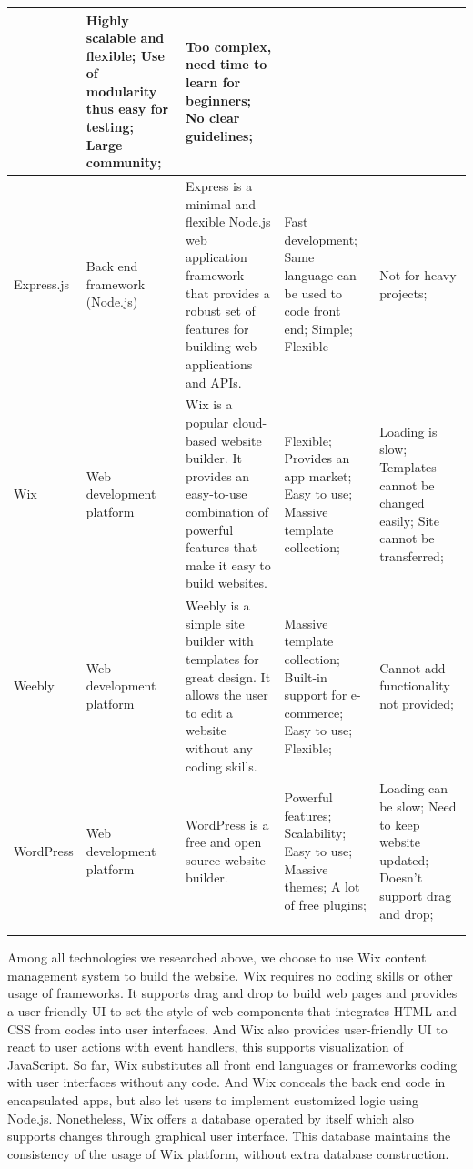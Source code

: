 \documentclass{report}
\begin{document}
\begin{tabularx}{0.95\linewidth}{%
  >{\raggedright\arraybackslash}p{1.5cm}%
  >{\raggedright\arraybackslash}p{1.8cm}%
  >{\raggedright\arraybackslash}X%
  >{\raggedright\arraybackslash}X%
  >{\raggedright\arraybackslash}X}
  & Highly scalable and flexible; Use of modularity thus easy for testing; Large community;
  & Too complex, need time to learn for beginners; No clear guidelines;
  \\
  \midrule
  Express.js
  & Back end framework (Node.js)
  & Express is a minimal and flexible Node.js web application framework that provides a robust set of features for building web applications and APIs.
  & Fast development; Same language can be used to code front end; Simple; Flexible
  & Not for heavy projects;
  \\
  \midrule
  Wix
  & Web development platform
  & Wix is a popular cloud-based website builder. It provides an easy-to-use combination of powerful features that make it easy to build websites.
  & Flexible; Provides an app market; Easy to use; Massive template collection;
  & Loading is slow; Templates cannot be changed easily; Site cannot be transferred;
  \\
  \midrule
  Weebly
  & Web development platform
  & Weebly is a simple site builder with templates for great design. It allows the user to edit a website without any coding skills.
  & Massive template collection; Built-in support for e-commerce; Easy to use; Flexible;
  & Cannot add functionality not provided;
  \\
  \midrule
  WordPress
  & Web development platform
  & WordPress is a free and open source website builder. 
  & Powerful features; Scalability; Easy to use; Massive themes; A lot of free plugins;
  & Loading can be slow; Need to keep website updated; Doesn't support drag and drop;
  \\
  \bottomrule
  \\
  \caption{Available Web Development Technologies}  
  \label{tab:availableWebDevelopmentTechnologies}
\end{tabularx}
Among all technologies we researched above, we choose to use Wix content management system to build the website. Wix requires no coding skills or other usage of frameworks. It supports drag and drop to build web pages and provides a user-friendly UI to set the style of web components that integrates HTML and CSS from codes into user interfaces. And Wix also provides user-friendly UI to react to user actions with event handlers, this supports visualization of JavaScript. So far, Wix substitutes all front end languages or frameworks coding with user interfaces without any code. And Wix conceals the back end code in encapsulated apps, but also let users to implement customized logic using Node.js. Nonetheless, Wix offers a database operated by itself which also supports changes through graphical user interface. This database maintains the consistency of the usage of Wix platform, without extra database construction.
\end{document}
